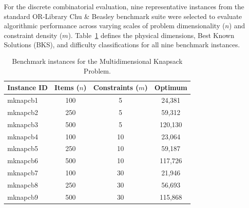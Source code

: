 \documentclass[review]{elsarticle}
\begin{document}
\begin{table}[htbp]
\centering
\caption{Execution parameters and computational budget.}
\label{tab:execution_parameters}
\end{table}

For the discrete combinatorial evaluation, nine representative instances from the standard OR-Library Chu \& Beasley benchmark suite were selected to evaluate algorithmic performance across varying scales of problem dimensionality ($n$) and constraint density ($m$). Table~\ref{tab:mkp_instances} defines the physical dimensions, Best Known Solutions (BKS), and difficulty classifications for all nine benchmark instances.
\begin{table}[htbp]
\centering
\caption{Benchmark instances for the Multidimensional Knapsack Problem.}
\label{tab:mkp_instances}
\begin{tabular}{lccc}
\toprule
\textbf{Instance ID} & \textbf{Items ($n$)} & \textbf{Constraints ($m$)} & \textbf{Optimum} \\
\midrule
mknapcb1 & 100 & 5 & 24,381 \\
mknapcb2 & 250 & 5 & 59,312 \\
mknapcb3 & 500 & 5 & 120,130  \\
mknapcb4 & 100 & 10 & 23,064 \\
mknapcb5 & 250 & 10 & 59,187 \\
mknapcb6 & 500 & 10 & 117,726  \\
mknapcb7 & 100 & 30 & 21,946 \\
mknapcb8 & 250 & 30 & 56,693  \\
mknapcb9 & 500 & 30 & 115,868\\
\bottomrule
\end{tabular}
\end{table}
\end{document}
